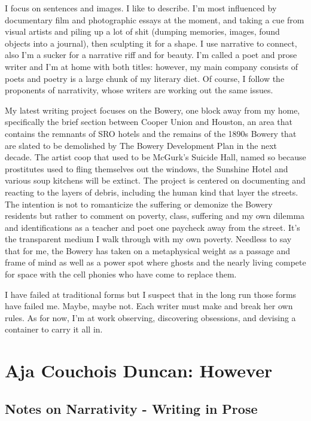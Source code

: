 \documentclass[
]{memoir}
\begin{document}
I focus on sentences and images. I like to describe. I'm most influenced
by documentary film and photographic essays at the moment, and taking a
cue from visual artists and piling up a lot of shit (dumping memories,
images, found objects into a journal), then sculpting it for a shape. I
use narrative to connect, also I'm a sucker for a narrative riff and for
beauty. I'm called a poet and prose writer and I'm at home with both
titles: however, my main company consists of poets and poetry is a large
chunk of my literary diet. Of course, I follow the proponents of
narrativity, whose writers are working out the same issues.

My latest writing project focuses on the Bowery, one block away from my
home, specifically the brief section between Cooper Union and Houston,
an area that contains the remnants of SRO hotels and the remains of the
1890s Bowery that are slated to be demolished by The Bowery Development
Plan in the next decade. The artist coop that used to be McGurk's
Suicide Hall, named so because prostitutes used to fling themselves out
the windows, the Sunshine Hotel and various soup kitchens will be
extinct. The project is centered on documenting and reacting to the
layers of debris, including the human kind that layer the streets. The
intention is not to romanticize the suffering or demonize the Bowery
residents but rather to comment on poverty, class, suffering and my own
dilemma and identifications as a teacher and poet one paycheck away from
the street. It's the transparent medium I walk through with my own
poverty. Needless to say that for me, the Bowery has taken on a
metaphysical weight as a passage and frame of mind as well as a power
spot where ghosts and the nearly living compete for space with the cell
phonies who have come to replace them.

I have failed at traditional forms but I suspect that in the long run
those forms have failed me. Maybe, maybe not. Each writer must make and
break her own rules. As for now, I'm at work observing, discovering
obsessions, and devising a container to carry it all in.

\hypertarget{aja-couchois-duncan-however}{%
\chapter{Aja Couchois Duncan:
However}\label{aja-couchois-duncan-however}}

\hypertarget{notes-on-narrativity---writing-in-prose}{%
\section*{Notes on Narrativity - Writing in
Prose}\label{notes-on-narrativity---writing-in-prose}}
\end{document}
